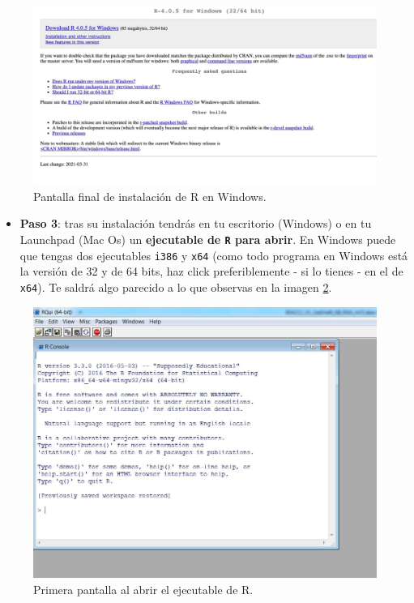 \documentclass[11pt,]{book}
\providecommand{\tightlist}{%
  \setlength{\itemsep}{0pt}\setlength{\parskip}{0pt}}
\begin{document}
\begin{figure}

{\centering \includegraphics[width=0.75\linewidth]{./img/pantalla_windows_2} 

}

\caption{Pantalla final de instalación de R en Windows.}\label{fig:pantalla-windows-2}
\end{figure}

\begin{itemize}
\tightlist
\item
  \textbf{Paso 3}: tras su instalación tendrás en tu escritorio (Windows) o en tu Launchpad (Mac Os) un \textbf{ejecutable de \texttt{R} para abrir}. En Windows puede que tengas dos ejecutables \texttt{i386} y \texttt{x64} (como todo programa en Windows está la versión de 32 y de 64 bits, haz click preferiblemente - si lo tienes - en el de \texttt{x64}). Te saldrá algo parecido a lo que observas en la imagen \ref{fig:cranR}.
\end{itemize}

\begin{figure}

{\centering \includegraphics[width=0.75\linewidth]{./img/cranR} 

}

\caption{Primera pantalla al abrir el ejecutable de R.}\label{fig:cranR}
\end{figure}
\end{document}
